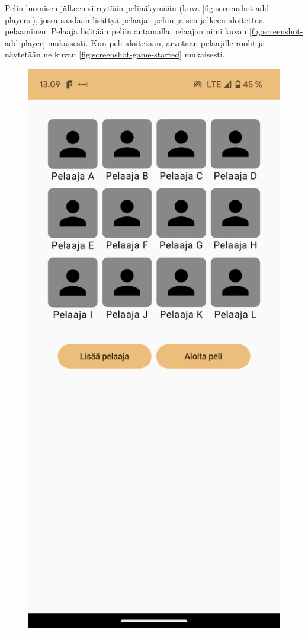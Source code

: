 Pelin luomisen jälkeen siirrytään pelinäkymään
(kuva \ref{fig:screenshot-add-players}), jossa saadaan lisättyä pelaajat peliin ja
sen jälkeen aloitettua pelaaminen. Pelaaja lisätään peliin antamalla pelaajan
nimi kuvan \ref{fig:screenshot-add-player} mukaisesti. Kun peli aloitetaan,
arvotaan pelaajille roolit ja näytetään ne kuvan
\ref{fig:screenshot-game-started} mukaisesti.

\begin{figure}[h!]
      \centering
      \begin{minipage}[t]{.3\textwidth}
            \includegraphics[width=\textwidth]{figures/screenshot-add-players.png}

\end{minipage}
\end{figure}
